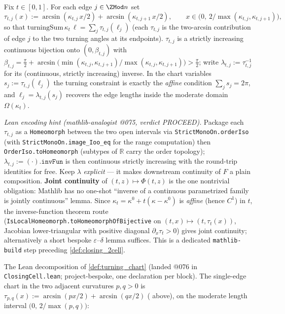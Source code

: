 \begin{definition}
  \label{def:turning_chart}
  Fix $t \in [0,1]$. For each edge $j \in \ZMod n$ set
  \[
    \tau_{t,j}(x) := \arcsin(\kappa_{t,j}\,x/2) + \arcsin(\kappa_{t,j+1}\,x/2),
    \qquad x \in \bigl(0,\ 2/\max(\kappa_{t,j},\kappa_{t,j+1})\bigr),
  \]
  so that $\mathrm{turningSum}\,\kappa_t\,\ell = \sum_j \tau_{t,j}(\ell_j)$ (each
  $\tau_{t,j}$ is the two-arcsin contribution of edge $j$ to the two turning
  angles at its endpoints). $\tau_{t,j}$ is a strictly increasing continuous
  bijection onto $(0,\beta_{t,j})$ with
  $\beta_{t,j} = \tfrac\pi2 + \arcsin\!\bigl(\min(\kappa_{t,j},\kappa_{t,j+1})/
  \max(\kappa_{t,j},\kappa_{t,j+1})\bigr) > \tfrac\pi2$; write $\lambda_{t,j} :=
  \tau_{t,j}^{-1}$ for its (continuous, strictly increasing) inverse. In the chart
  variables $s_j := \tau_{t,j}(\ell_j)$ the turning constraint is exactly the
  \emph{affine} condition $\sum_j s_j = 2\pi$, and $\ell_j = \lambda_{t,j}(s_j)$
  recovers the edge lengths inside the moderate domain $\Omega(\kappa_t)$.
\end{definition}

\emph{Lean encoding hint (mathlib-analogist @075, verdict PROCEED).} Package each
$\tau_{t,j}$ as a \texttt{Homeomorph} between the two open intervals via
\texttt{StrictMonoOn.orderIso} (with \texttt{StrictMonoOn.image\_Ioo\_eq} for the
range computation) then \texttt{OrderIso.toHomeomorph} (subtypes of $\mathbb{R}$
carry the order topology); $\lambda_{t,j} := (\cdot).\mathtt{invFun}$ is then
continuous strictly increasing with the round-trip identities for free. Keep
$\lambda$ \emph{explicit} --- it makes downstream continuity of $F$ a plain
composition. \textbf{Joint continuity} of $(t,z)\mapsto\Phi(t,z)$ is the one
nontrivial obligation: Mathlib has no one-shot ``inverse of a continuous
parametrized family is jointly continuous'' lemma. Since $\kappa_t = \kappa^0 +
t(\kappa-\kappa^0)$ is \emph{affine} (hence $C^1$) in $t$, the inverse-function
theorem route (\texttt{IsLocalHomeomorph.toHomeomorphOfBijective} on
$(t,x)\mapsto(t,\tau_t(x))$, Jacobian lower-triangular with positive diagonal
$\partial_x\tau_t>0$) gives joint continuity; alternatively a short bespoke
$\varepsilon$--$\delta$ lemma suffices. This is a dedicated \texttt{mathlib-build}
step preceding \cref{def:closing_2cell}.

The Lean decomposition of \cref{def:turning_chart} (landed @076 in
\texttt{ClosingCell.lean}; project-bespoke, one declaration per block). The
single-edge chart in the two adjacent curvatures $p, q > 0$ is
$\tau_{p,q}(x) := \arcsin(px/2) + \arcsin(qx/2)$
( above), on the moderate length interval
$\bigl(0,\, 2/\max(p,q)\bigr)$:

